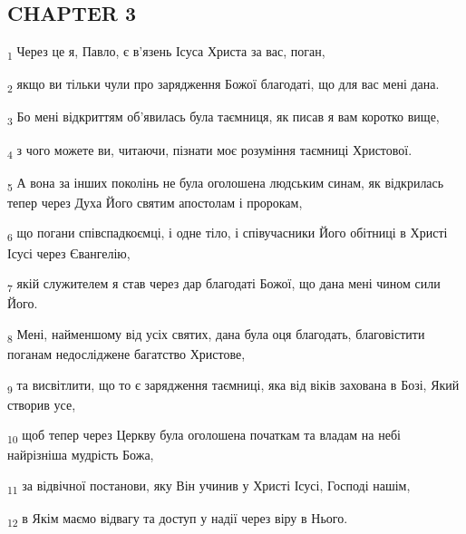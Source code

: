 \subsection{CHAPTER 3}
\begin{tcolorbox}
\textsubscript{1} Через це я, Павло, є в'язень Ісуса Христа за вас, поган,
\end{tcolorbox}
\begin{tcolorbox}
\textsubscript{2} якщо ви тільки чули про зарядження Божої благодаті, що для вас мені дана.
\end{tcolorbox}
\begin{tcolorbox}
\textsubscript{3} Бо мені відкриттям об'явилась була таємниця, як писав я вам коротко вище,
\end{tcolorbox}
\begin{tcolorbox}
\textsubscript{4} з чого можете ви, читаючи, пізнати моє розуміння таємниці Христової.
\end{tcolorbox}
\begin{tcolorbox}
\textsubscript{5} А вона за інших поколінь не була оголошена людським синам, як відкрилась тепер через Духа Його святим апостолам і пророкам,
\end{tcolorbox}
\begin{tcolorbox}
\textsubscript{6} що погани співспадкоємці, і одне тіло, і співучасники Його обітниці в Христі Ісусі через Євангелію,
\end{tcolorbox}
\begin{tcolorbox}
\textsubscript{7} якій служителем я став через дар благодаті Божої, що дана мені чином сили Його.
\end{tcolorbox}
\begin{tcolorbox}
\textsubscript{8} Мені, найменшому від усіх святих, дана була оця благодать, благовістити поганам недосліджене багатство Христове,
\end{tcolorbox}
\begin{tcolorbox}
\textsubscript{9} та висвітлити, що то є зарядження таємниці, яка від віків захована в Бозі, Який створив усе,
\end{tcolorbox}
\begin{tcolorbox}
\textsubscript{10} щоб тепер через Церкву була оголошена початкам та владам на небі найрізніша мудрість Божа,
\end{tcolorbox}
\begin{tcolorbox}
\textsubscript{11} за відвічної постанови, яку Він учинив у Христі Ісусі, Господі нашім,
\end{tcolorbox}
\begin{tcolorbox}
\textsubscript{12} в Якім маємо відвагу та доступ у надії через віру в Нього.
\end{tcolorbox}
